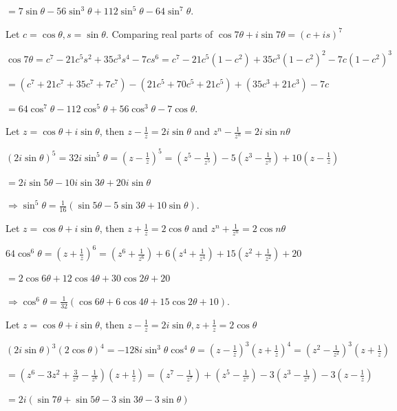   $= 7\sin\theta - 56\sin^3\theta + 112\sin^5\theta - 64\sin^7\theta$.
\item Let $c = \cos\theta, s = \sin\theta$. Comparing real parts of $\cos7\theta + i\sin7\theta = (c +
  is)^7$

  $\cos7\theta = c^7 - 21c^5s^2 + 35c^3s^4 - 7cs^6 = c^7 - 21c^5\left(1 - c^2\right) + 35c^3\left(1 -
  c^2\right)^2 - 7c\left(1 - c^2\right)^3$

  $= (c^7 + 21c^7 + 35c^7 + 7c^7) - (21c^5 + 70c^5 + 21c^5) + (35c^3 + 21c^3) - 7c$

  $= 64\cos^7\theta - 112\cos^5\theta + 56\cos^3\theta - 7\cos\theta$.
\item Let $z = \cos\theta + i\sin\theta$, then $z - \frac{1}{z} = 2i\sin\theta$ and $z^n - \frac{1}{z^n} =
  2i\sin n\theta$

  $(2i\sin\theta)^5 = 32i\sin^5\theta = \left(z - \frac{1}{z}\right)^5 = \left(z^5 - \frac{1}{z^5}\right) -
  5\left(z^3 - \frac{1}{z^3}\right) + 10\left(z - \frac{1}{z}\right)$

  $= 2i\sin5\theta - 10i\sin3\theta + 20i\sin\theta$

  $\Rightarrow \sin^5\theta = \frac{1}{16}(\sin5\theta - 5\sin3\theta + 10\sin\theta)$.
\item Let $z = \cos\theta + i\sin\theta$, then $z + \frac{1}{z} = 2\cos\theta$ and $z^n + \frac{1}{z^n} =
  2\cos n\theta$

  $64\cos^6\theta = \left(z + \frac{1}{z}\right)^6 = \left(z^6 + \frac{1}{z^6}\right) + 6\left(z^4 +
  \frac{1}{z^4}\right) + 15\left(z^2 + \frac{1}{z^2}\right) + 20$

  $= 2\cos6\theta + 12\cos4\theta + 30\cos2\theta + 20$

  $\Rightarrow \cos^6\theta = \frac{1}{32}(\cos6\theta + 6\cos4\theta + 15\cos2\theta + 10)$.
\item Let $z = \cos\theta + i\sin\theta$, then $z - \frac{1}{z} = 2i\sin\theta, z + \frac{1}{z} =
  2\cos\theta$

  $(2i\sin\theta)^3(2\cos\theta)^4 = -128i\sin^3\theta\cos^4\theta = \left(z - \frac{1}{z}\right)^3\left(z
  + \frac{1}{z}\right)^4 = \left(z^2 - \frac{1}{z^2}\right)^3\left(z + \frac{1}{z}\right)$

  $= \left(z^6 - 3z^2 + \frac{3}{z^2} - \frac{1}{z^6}\right)\left(z + \frac{1}{z}\right) = \left(z^7 -
  \frac{1}{z^7}\right) + \left(z^5 - \frac{1}{z^5}\right) - 3\left(z^3 - \frac{1}{z^3}\right) - 3\left(z -
  \frac{1}{z}\right)$

  $= 2i(\sin7\theta + \sin5\theta - 3\sin3\theta - 3\sin\theta)$

